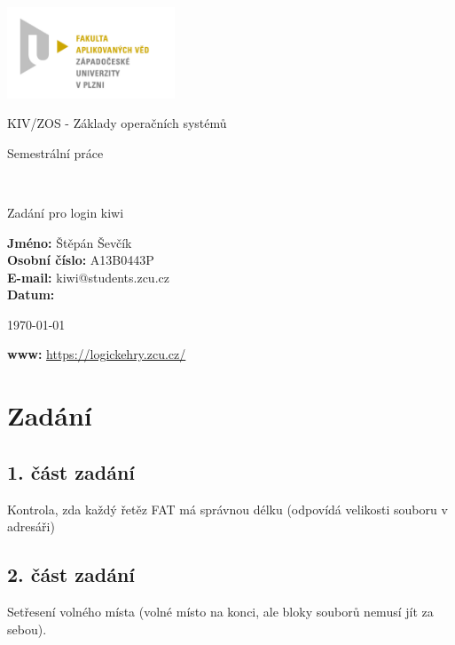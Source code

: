\documentclass[12pt,a4paper]{article}
\author{Jan Šmejkal}
\let\oldsection\section
\renewcommand\section{\clearpage\oldsection}
\begin{document}
\begin{titlepage}

\includegraphics[width=50mm]{img/FAV.jpg}
\\[160 pt]
\centerline{ \Huge \sc KIV/ZOS - Základy operačních systémů}
\centerline{ \huge \sc Semestrální práce }
\\[12 pt]
{\large \sc
\centerline{Zadání pro login kiwi}
}


{
\vfill 
\parindent=0cm
\textbf{Jméno:} Štěpán Ševčík\\
\textbf{Osobní číslo:} A13B0443P\\
\textbf{E-mail:} kiwi@students.zcu.cz\\
\textbf{Datum:} {\large \today\par} %
\textbf{www:} \url{https://logickehry.zcu.cz/}

}

\end{titlepage}


\newpage
\setcounter{page}{2}
\setcounter{tocdepth}{3}
\tableofcontents

\section{Zadání}
\subsection{1. část zadání}
Kontrola, zda každý řetěz FAT má správnou délku (odpovídá velikosti souboru v adresáři)
\subsection{2. část zadání}
Setřesení volného místa (volné místo na konci, ale bloky souborů nemusí jít za sebou).
\end{document}
